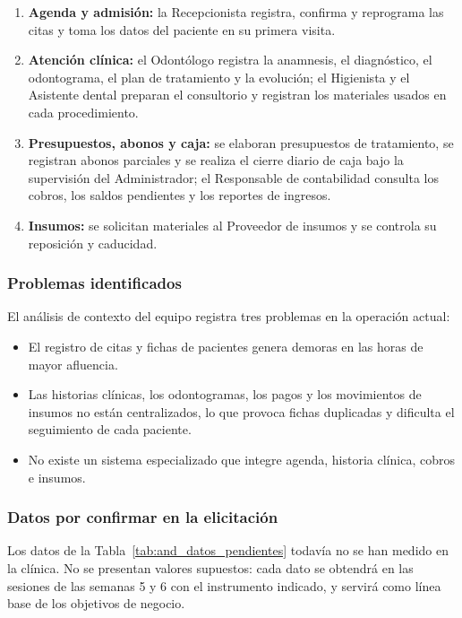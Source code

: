 \begin{enumerate}
    \item \textbf{Agenda y admisi{\'o}n:} la Recepcionista registra, confirma y reprograma las citas y toma los datos del paciente en su primera visita.
    \item \textbf{Atenci{\'o}n cl{\'i}nica:} el Odont{\'o}logo registra la anamnesis, el diagn{\'o}stico, el odontograma, el plan de tratamiento y la evoluci{\'o}n; el Higienista y el Asistente dental preparan el consultorio y registran los materiales usados en cada procedimiento.
    \item \textbf{Presupuestos, abonos y caja:} se elaboran presupuestos de tratamiento, se registran abonos parciales y se realiza el cierre diario de caja bajo la supervisi{\'o}n del Administrador; el Responsable de contabilidad consulta los cobros, los saldos pendientes y los reportes de ingresos.
    \item \textbf{Insumos:} se solicitan materiales al Proveedor de insumos y se controla su reposici{\'o}n y caducidad.
\end{enumerate}

\subsubsection{Problemas identificados}

El an{\'a}lisis de contexto del equipo registra tres problemas en la operaci{\'o}n actual:

\begin{itemize}
    \item El registro de citas y fichas de pacientes genera demoras en las horas de mayor afluencia.
    \item Las historias cl{\'i}nicas, los odontogramas, los pagos y los movimientos de insumos no est{\'a}n centralizados, lo que provoca fichas duplicadas y dificulta el seguimiento de cada paciente.
    \item No existe un sistema especializado que integre agenda, historia cl{\'i}nica, cobros e insumos.
\end{itemize}

\subsubsection{Datos por confirmar en la elicitaci{\'o}n}

Los datos de la Tabla~\ref{tab:and_datos_pendientes} todav{\'i}a no se han medido en la cl{\'i}nica. No se presentan valores supuestos: cada dato se obtendr{\'a} en las sesiones de las semanas 5 y 6 con el instrumento indicado, y servir{\'a} como l{\'i}nea base de los objetivos de negocio.

